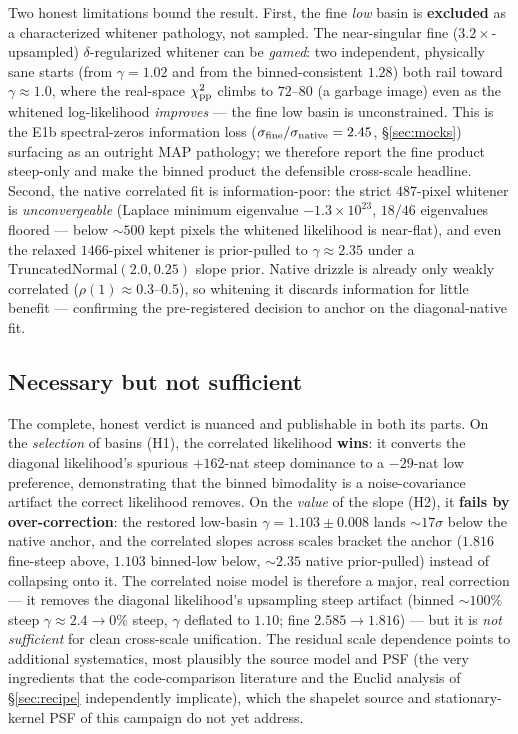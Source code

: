 \documentclass[11pt,letterpaper]{article}
\newcommand{\gammaEPL}{\ensuremath{\gamma}}
\begin{document}
Two honest limitations bound the result. First, the fine {\it low} basin is
{\bf excluded} as a characterized whitener pathology, not sampled. The
near-singular fine ($3.2\times$-upsampled) $\delta$-regularized whitener can be
{\it gamed}: two independent, physically sane starts (from $\gammaEPL=1.02$ and
from the binned-consistent $1.28$) both rail toward $\gammaEPL\approx1.0$, where
the real-space $\chi^2_{\rm pp}$ climbs to $72$--$80$ (a garbage image) even as
the whitened log-likelihood {\it improves} --- the fine low basin is
unconstrained. This is the E1b spectral-zeros information loss
($\sigma_{\rm fine}/\sigma_{\rm native}=2.45$, \S\ref{sec:mocks}) surfacing as
an outright MAP pathology; we therefore report the fine product steep-only and
make the binned product the defensible cross-scale headline. Second, the native
correlated fit is information-poor: the strict $487$-pixel whitener is
{\it unconvergeable} (Laplace minimum eigenvalue $-1.3\times10^{23}$,
$18/46$ eigenvalues floored --- below $\sim$$500$ kept pixels the whitened
likelihood is near-flat), and even the relaxed $1466$-pixel whitener is
prior-pulled to $\gammaEPL\approx2.35$ under a $\mathrm{TruncatedNormal}(2.0,
0.25)$ slope prior. Native drizzle is already only weakly correlated
($\rho(1)\approx0.3$--$0.5$), so whitening it discards information for little
benefit --- confirming the pre-registered decision to anchor on the
diagonal-native fit.

\subsection{Necessary but not sufficient}
\label{sec:necsuff}

The complete, honest verdict is nuanced and publishable in both its parts. On
the {\it selection} of basins (H1), the correlated likelihood {\bf wins}: it
converts the diagonal likelihood's spurious $+162$-nat steep dominance to a
$-29$-nat low preference, demonstrating that the binned bimodality is a
noise-covariance artifact the correct likelihood removes. On the {\it value} of
the slope (H2), it {\bf fails by over-correction}: the restored low-basin
$\gammaEPL=1.103\pm0.008$ lands $\sim$$17\sigma$ below the native anchor, and
the correlated slopes across scales bracket the anchor
($1.816$ fine-steep above, $1.103$ binned-low below, $\sim$$2.35$ native
prior-pulled) instead of collapsing onto it. The correlated noise model is
therefore a major, real correction --- it removes the diagonal likelihood's
upsampling steep artifact (binned $\sim$$100\%$ steep $\gammaEPL\approx2.4\to0\%$
steep, $\gammaEPL$ deflated to $1.10$; fine $2.585\to1.816$) --- but it is
{\it not sufficient} for clean cross-scale unification. The residual
scale dependence points to additional systematics, most plausibly the source
model and PSF (the very ingredients that the code-comparison literature
\citep{etherington2024codecomparison} and the Euclid analysis of
\S\ref{sec:recipe} independently implicate), which the shapelet source and
stationary-kernel PSF of this campaign do not yet address.
\end{document}
